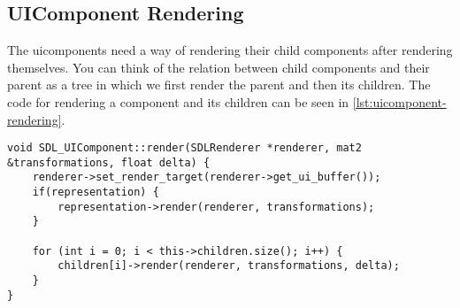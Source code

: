 \subsection{UIComponent Rendering}
\label{sec:rendering-ui}

The uicomponents need a way of rendering their child components after 
rendering themselves. You can think of the relation between child components 
and their parent as a tree in which we first render the parent and then its 
children. The code for rendering a component and its children can be 
seen in \cref{lst:uicomponent-rendering}.
\\
\begin{lstlisting}[caption={UIComponent rendering.},
label={lst:uicomponent-rendering}]
void SDL_UIComponent::render(SDLRenderer *renderer, mat2 &transformations, float delta) {
    renderer->set_render_target(renderer->get_ui_buffer());
    if(representation) {
        representation->render(renderer, transformations);
    }

    for (int i = 0; i < this->children.size(); i++) {
        children[i]->render(renderer, transformations, delta);
    }
}
\end{lstlisting}

